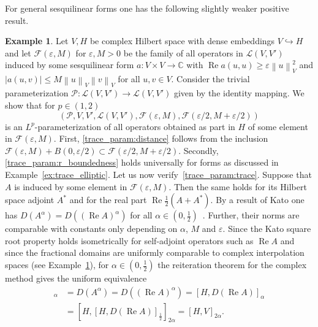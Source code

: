 \documentclass[reqno,a4paper,final]{amsart}
\numberwithin{equation}{section}
\theoremstyle{definition}
\newtheorem{example}[lemma]{Example}
\begin{document}
	 For general sesquilinear forms one has the following slightly weaker positive result.
	 
	 \begin{example}\label{ex:form}
	 	Let $V,H$ be complex Hilbert space with dense embeddings $V \hookrightarrow H$ and let $\mathcal{F}({\varepsilon}, M)$ for ${\varepsilon}, M > 0$ be the family of all operators in $\mathcal{L}(V,V')$ induced by some sesquilinear form $a\colon V \times V \to {\mathbb{C}}$ with ${\operatorname{Re}} a(u,u) \ge {\varepsilon} {\left\lVert{u}\right\rVert}_V^2$ and ${\left\lvert{a(u,v)}\right\rvert} \le M {\left\lVert{u}\right\rVert}_V {\left\lVert{v}\right\rVert}_V$ for all $u, v \in V$. Consider the trivial parameterization $\mathcal{P}\colon \mathcal{L}(V,V') \to \mathcal{L}(V,V')$ given by the identity mapping. We show that for $p \in (1,2)$
		\begin{equation*}
			(\mathcal{P},V,V',\mathcal{L}(V,V'), \mathcal{F}({\varepsilon},M), \mathcal{F}({\varepsilon}/2, M + {\varepsilon}/2))
		\end{equation*} 
		is an $L^p$-parameterization of all operators obtained as part in $H$ of some element in $\mathcal{F}({\varepsilon},M)$. First, \ref{trace_param:distance} follows from the inclusion $\mathcal{F}({\varepsilon},M) + B(0,{\varepsilon}/2) \subset \mathcal{F}({\varepsilon}/2, M + {\varepsilon}/2)$. Secondly, \ref{trace_param:r_boundedness} holds universally for forms as discussed in Example~\ref{ex:trace_elliptic}. Let us now verify~\ref{trace_param:trace}. Suppose that $A$ is induced by some element in $\mathcal{F}({\varepsilon},M)$. Then the same holds for its Hilbert space adjoint $A^*$ and for the real part ${\operatorname{Re}} \frac{1}{2} (A+A^*)$. By a result of Kato one has $D(A^{\alpha}) = D(({\operatorname{Re}} A)^{\alpha})$ for all $\alpha \in (0, \frac{1}{2})$~\cite[Theorem~3.1]{Kat61b}. Further, their norms are comparable with constants only depending on $\alpha$, $M$ and ${\varepsilon}$. Since the Kato square root property holds isometrically for self-adjoint operators such as ${\operatorname{Re}} A$ and since the fractional domains are uniformly comparable to complex interpolation spaces (see Example~\ref{ex:form}), for $\alpha \in (0,\frac{1}{2})$ the reiteration theorem for the complex method gives the uniform equivalence~\cite[Theorem~4.6.1]{BerLoe76}
		\begin{align*}
			[H,D(A)]_{\alpha} & = D(A^{\alpha}) = D(({\operatorname{Re}} A)^{\alpha}) = [H, D({\operatorname{Re}} A)]_{\alpha} \\
			& = [H,[H,D({\operatorname{Re}} A)]_{\frac{1}{2}}]_{2\alpha} = [H,V]_{2\alpha}.

\end{align*}
\end{example}
\end{document}
